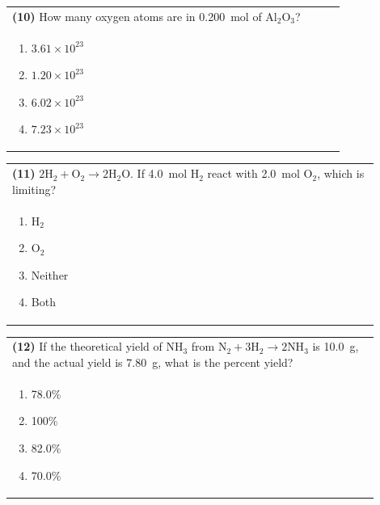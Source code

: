 \documentclass{article}
\begin{document}
{{\vspace{0.2cm}
\noindent\begin{tabular}{|p{0.9\linewidth}|}
\hline
\textbf{(10)} How many oxygen atoms are in 0.200~mol of Al$_2$O$_3$?\\[0.2cm]

\begin{minipage}[t]{0.85\linewidth}
\begin{enumerate}[label=\alph*.]
\item $3.61\times10^{23}$
\item $1.20\times10^{23}$
\item $6.02\times10^{23}$
\item $7.23\times10^{23}$
\end{enumerate}
\end{minipage}\\[0.2cm]
\hline
\end{tabular}

\vspace{0.2cm}
\noindent\begin{tabular}{|p{0.9\linewidth}|}
\hline
\textbf{(11)} $2\text{H}_2 + \text{O}_2 \rightarrow 2\text{H}_2\text{O}$. If 4.0~mol H$_2$ react with 2.0~mol O$_2$, which is limiting?\\[0.2cm]

\begin{minipage}[t]{0.85\linewidth}
\begin{enumerate}[label=\alph*.]
\item H$_2$
\item O$_2$
\item Neither
\item Both
\end{enumerate}
\end{minipage}\\[0.2cm]
\hline
\end{tabular}

\vspace{0.2cm}
\noindent\begin{tabular}{|p{0.9\linewidth}|}
\hline
\textbf{(12)} If the theoretical yield of NH$_3$ from $\text{N}_2 + 3\text{H}_2 \rightarrow 2\text{NH}_3$ is 10.0~g, and the actual yield is 7.80~g, what is the percent yield?\\[0.2cm]

\begin{minipage}[t]{0.85\linewidth}
\begin{enumerate}[label=\alph*.]
\item 78.0\%
\item 100\%
\item 82.0\%
\item 70.0\%
\end{enumerate}
\end{minipage}\\[0.2cm]
\hline
\end{tabular}

}}
\end{document}
